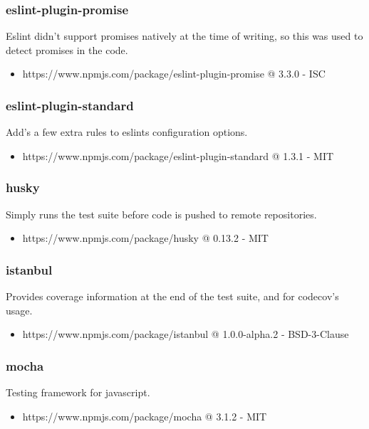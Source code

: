  \subsubsection{eslint-plugin-promise}
  Eslint didn't support promises natively at the time of writing, so this was used to detect promises in the code.
  \begin{itemize}
    \item https://www.npmjs.com/package/eslint-plugin-promise @ 3.3.0 - ISC
  \end{itemize}

  \subsubsection{eslint-plugin-standard}
  Add's a few extra rules to eslints configuration options.
  \begin{itemize}
    \item https://www.npmjs.com/package/eslint-plugin-standard @ 1.3.1 - MIT
  \end{itemize}

  \subsubsection{husky}
  Simply runs the test suite before code is pushed to remote repositories.
  \begin{itemize}
    \item https://www.npmjs.com/package/husky @ 0.13.2 - MIT
  \end{itemize}

  \subsubsection{istanbul}
  Provides coverage information at the end of the test suite, and for codecov's usage.
  \begin{itemize}
    \item https://www.npmjs.com/package/istanbul @ 1.0.0-alpha.2 - BSD-3-Clause
  \end{itemize}

  \subsubsection{mocha}
  Testing framework for javascript.
  \begin{itemize}
    \item https://www.npmjs.com/package/mocha @ 3.1.2 - MIT
  \end{itemize}

